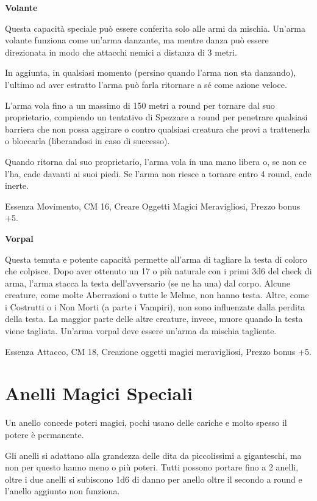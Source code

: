 \documentclass[a4paper,11pt,twoside,openany]{book}
\begin{document}
\textbf{Volante}

Questa capacità speciale può essere conferita solo alle armi da mischia. Un'arma volante funziona come un'arma danzante, ma mentre danza può essere direzionata in modo che attacchi nemici a distanza di 3 metri.

In aggiunta, in qualsiasi momento (persino quando l'arma non sta danzando), l'ultimo ad aver estratto l'arma può farla ritornare a sé come azione veloce.

L'arma vola fino a un massimo di 150 metri a round per tornare dal suo proprietario, compiendo un tentativo di Spezzare a round per penetrare qualsiasi barriera che non possa aggirare o contro qualsiasi creatura che provi a trattenerla o bloccarla (liberandosi in caso di successo).

Quando ritorna dal suo proprietario, l'arma vola in una mano libera o, se non ce l'ha, cade davanti ai suoi piedi. Se l'arma non riesce a tornare entro 4 round, cade inerte.

Essenza Movimento, CM 16, Creare Oggetti Magici Meravigliosi, Prezzo bonus +5.

\textbf{Vorpal}

Questa temuta e potente capacità permette all'arma di tagliare la testa di coloro che colpisce. Dopo aver ottenuto un 17 o più naturale con i primi 3d6 del check di arma, l'arma stacca la testa dell'avversario (se ne ha una) dal corpo. Alcune creature, come molte Aberrazioni o tutte le Melme, non hanno testa. Altre, come i Costrutti o i Non Morti (a parte i Vampiri), non sono influenzate dalla perdita della testa. La maggior parte delle altre creature, invece, muore quando la testa viene tagliata. Un'arma vorpal deve essere un'arma da mischia tagliente.

Essenza Attacco, CM 18, Creazione oggetti magici meravigliosi, Prezzo bonus +5.

\pagebreak

\section{Anelli Magici Speciali}

\label{anelli-magici-speciali}

Un anello concede poteri magici, pochi usano delle cariche e molto spesso il potere è permanente.

Gli anelli si adattano alla grandezza delle dita da piccolissimi a giganteschi, ma non per questo hanno meno o più poteri. Tutti possono portare fino a 2 anelli, oltre i due anelli si subiscono 1d6 di danno per anello oltre il secondo a round e l'anello aggiunto non funziona.
\end{document}
